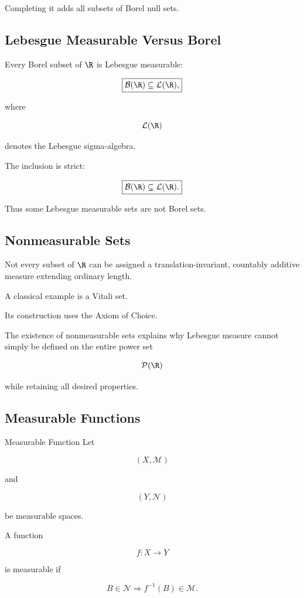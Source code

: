 Completing it adds all subsets of Borel null sets.

\subsection{Lebesgue Measurable Versus Borel}
\label{subsec:lebesgue-vs-borel}

Every Borel subset of \(\R\) is Lebesgue measurable:

\[
\boxed{
\mathcal{B}(\R)
\subseteq
\mathcal{L}(\R),
}
\]

where

\[
\mathcal{L}(\R)
\]

denotes the Lebesgue sigma-algebra.

The inclusion is strict:

\[
\boxed{
\mathcal{B}(\R)
\subsetneq
\mathcal{L}(\R).
}
\]

Thus some Lebesgue measurable sets are not Borel sets.

\subsection{Nonmeasurable Sets}
\label{subsec:nonmeasurable-sets}

Not every subset of \(\R\) can be assigned a translation-invariant,
countably additive measure extending ordinary length.

A classical example is a Vitali set.

Its construction uses the Axiom of Choice.

The existence of nonmeasurable sets explains why Lebesgue measure cannot
simply be defined on the entire power set

\[
\mathcal{P}(\R)
\]

while retaining all desired properties.

\subsection{Measurable Functions}
\label{subsec:measurable-functions}

\begin{definitionbox}{Measurable Function}
Let

\[
(X,\mathcal{M})
\]

and

\[
(Y,\mathcal{N})
\]

be measurable spaces.

A function

\[
f:X\to Y
\]

is measurable if

\[
\boxed{
B\in\mathcal{N}
\Longrightarrow
f^{-1}(B)\in\mathcal{M}.
}
\]
\end{definitionbox}

